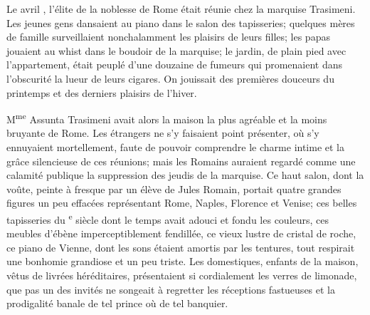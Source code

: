 
Le  avril , l'élite de la noblesse de Rome était réunie chez la
marquise Trasimeni. Les jeunes gens dansaient au piano dans le salon des
tapisseries; quelques mères de famille surveillaient nonchalamment les
plaisirs de leurs filles; les papas jouaient au whist dans le boudoir de
la marquise; le jardin, de plain pied avec l'appartement, était peuplé
d'une douzaine de fumeurs qui promenaient dans l'obscurité la lueur de
leurs cigares. On jouissait des premières douceurs du printemps et des
derniers plaisirs de l'hiver.

M\textsuperscript{me} Assunta Trasimeni avait alors la maison la plus
agréable et la moins bruyante de Rome. Les étrangers ne s'y faisaient
point présenter, où s'y ennuyaient mortellement, faute de pouvoir
comprendre le charme intime et la grâce silencieuse de ces réunions;
mais les Romains auraient regardé comme une calamité publique la
suppression des jeudis de la marquise. Ce haut salon, dont la voûte,
peinte à fresque par un élève de Jules Romain, portait quatre grandes
figures un peu effacées représentant Rome, Naples, Florence et Venise;
ces belles tapisseries du \textsuperscript{e} siècle dont le temps
avait adouci et fondu les couleurs, ces meubles d'ébène
imperceptiblement fendillée, ce vieux lustre de cristal de roche, ce
piano de Vienne, dont les sons étaient amortis par les tentures, tout
respirait une bonhomie grandiose et un peu triste. Les domestiques,
enfants de la maison, vêtus de livrées héréditaires, présentaient si
cordialement les verres de limonade, que pas un des invités ne songeait
à regretter les réceptions fastueuses et la prodigalité banale de tel
prince où de tel banquier.

